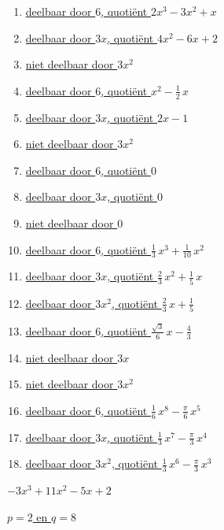 \documentclass{ximera}
\begin{document}
\begin{Antwoord} \label{antw2.2}
\begin{enumerate}
\item
\hyperlink{oef2.2}{deelbaar door $6$, quoti\"ent $2x^3 - 3x^2 + x$} 
\item[]
\hyperlink{oef2.2}{deelbaar door $3x$, quoti\"ent $4x^2 - 6x + 2$} 
\item[]
\hyperlink{oef2.2}{niet deelbaar door $3x^2$}
\item
\hyperlink{oef2.2}{deelbaar door $6$, quoti\"ent $x^2 - \frac{1}{2}\,x$} 
\item[]
\hyperlink{oef2.2}{deelbaar door $3x$, quoti\"ent $2x-1$} 
\item[]
\hyperlink{oef2.2}{niet deelbaar door $3x^2$}
\item
\hyperlink{oef2.2}{deelbaar door $6$, quoti\"ent $0$} 
\item[]
\hyperlink{oef2.2}{deelbaar door $3x$, quoti\"ent $0$} 
\item[]
\hyperlink{oef2.2}{niet deelbaar door $0$}
\item
\hyperlink{oef2.2}{deelbaar door $6$, quoti\"ent $\frac{1}{3}\,x^3 + \frac{1}{10}\,x^2$} 
\item[]
\hyperlink{oef2.2}{deelbaar door $3x$, quoti\"ent $\frac{2}{3}\,x^2 + \frac{1}{5}\,x$} 
\item[]
\hyperlink{oef2.2}{deelbaar door $3x^2$, quoti\"ent $\frac{2}{3}\,x + \frac{1}{5}$}
\item
\hyperlink{oef2.2}{deelbaar door $6$, quoti\"ent $\frac{\sqrt{3}}{6}\,x - \frac{4}{3}$} 
\item[]
\hyperlink{oef2.2}{niet deelbaar door $3x$}
\item[]
\hyperlink{oef2.2}{niet deelbaar door $3x^2$}
\item
\hyperlink{oef2.2}{deelbaar door $6$, quoti\"ent $\frac{1}{6}\,x^8 - \frac{\pi}{6}\,x^5$} 
\item[]
\hyperlink{oef2.2}{deelbaar door $3x$, quoti\"ent $\frac{1}{3}\,x^7 - \frac{\pi}{3}\,x^4$} 
\item[]
\hyperlink{oef2.2}{deelbaar door $3x^2$, quoti\"ent $\frac{1}{3}\,x^6 - \frac{\pi}{3}\,x^3$}
\end{enumerate}
\end{Antwoord}

\begin{Antwoord} \label{antw2.3}
\hyperlink{oef2.3}{$-3x^3+11x^2-5x+2$}
\end{Antwoord}

\begin{Antwoord} \label{antw2.4}
\hyperlink{oef2.4}{$p=2$ en $q=8$}
\end{Antwoord}
\end{document}
